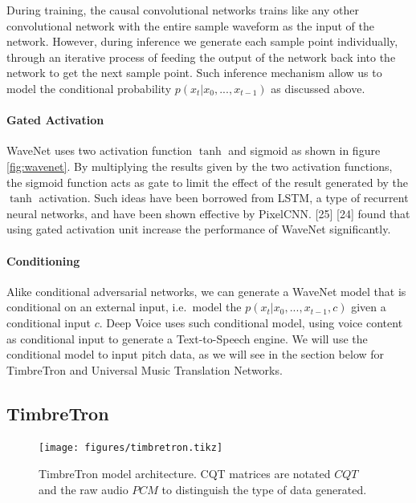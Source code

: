 \documentclass[12pt,a4paper,]{report}
\begin{document}
During training, the causal convolutional networks trains like any other
convolutional network with the entire sample waveform as the input of
the network. However, during inference we generate each sample point
individually, through an iterative process of feeding the output of the
network back into the network to get the next sample point. Such
inference mechanism allow us to model the conditional probability
\(p(x_t | x_0, ..., x_{t-1})\) as discussed above.

\paragraph{Gated Activation}

WaveNet uses two activation function \(\tanh\) and sigmoid as shown in
figure \ref{fig:wavenet}. By multiplying the results given by the two
activation functions, the sigmoid function acts as gate to limit the
effect of the result generated by the \(\tanh\) activation. Such ideas
have been borrowed from LSTM, a type of recurrent neural networks, and
have been shown effective by PixelCNN. {[}25{]} {[}24{]} found that
using gated activation unit increase the performance of WaveNet
significantly.

\paragraph{Conditioning}

Alike conditional adversarial networks, we can generate a WaveNet model
that is conditional on an external input, i.e.~model the
\(p(x_t | x_0, ..., x_{t-1}, c)\) given a conditional input \(c\). Deep
Voice uses such conditional model, using voice content as conditional
input to generate a Text-to-Speech engine. We will use the conditional
model to input pitch data, as we will see in the section below for
TimbreTron and Universal Music Translation Networks.

\hypertarget{timbretron}{%
\subsection{TimbreTron}\label{timbretron}}

\begin{figure}[h]
    \texttt{[image: figures/timbretron.tikz]}
    \centering
    \caption[TimbreTron model architecture]{TimbreTron model architecture. CQT matrices are notated $CQT$ and the raw audio $PCM$ to distinguish the type of data generated.} \label{fig:timbretron}
\end{figure}
\end{document}
